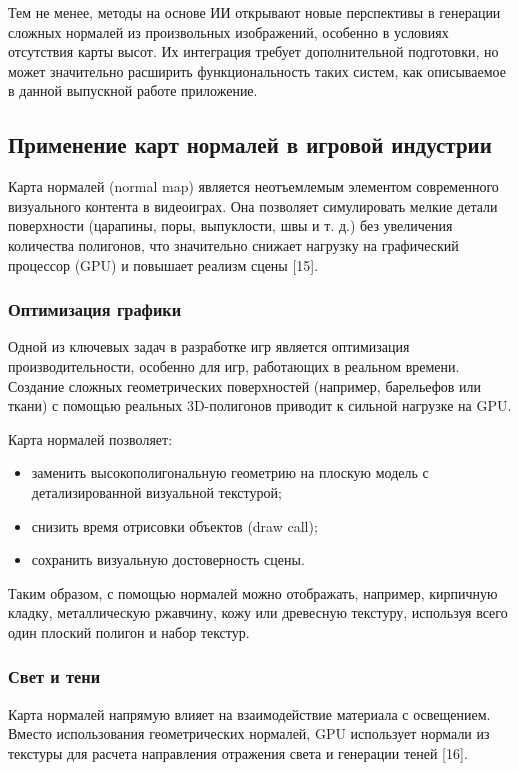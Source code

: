 Тем не менее, методы на основе ИИ открывают новые перспективы в генерации сложных нормалей из произвольных изображений, особенно в условиях отсутствия карты высот. Их интеграция требует дополнительной подготовки, но может значительно расширить функциональность таких систем, как описываемое в данной выпускной работе приложение.
\subsection{Применение карт нормалей в игровой индустрии}

Карта нормалей (normal map) является неотъемлемым элементом современного визуального контента в видеоиграх. Она позволяет симулировать мелкие детали поверхности (царапины, поры, выпуклости, швы и т. д.) без увеличения количества полигонов, что значительно снижает нагрузку на графический процессор (GPU) и повышает реализм сцены [15].
\subsubsection{Оптимизация графики}

Одной из ключевых задач в разработке игр является оптимизация производительности, особенно для игр, работающих в реальном времени. Создание сложных геометрических поверхностей (например, барельефов или ткани) с помощью реальных 3D-полигонов приводит к сильной нагрузке на GPU.

Карта нормалей позволяет: 
\begin{itemize}
	\item заменить высокополигональную геометрию на плоскую модель с детализированной визуальной текстурой;
	\item снизить время отрисовки объектов (draw call);
	\item сохранить визуальную достоверность сцены.
\end{itemize}

Таким образом, с помощью нормалей можно отображать, например, кирпичную кладку, металлическую ржавчину, кожу или древесную текстуру, используя всего один плоский полигон и набор текстур.
\subsubsection{Свет и тени}

Карта нормалей напрямую влияет на взаимодействие материала с освещением. Вместо использования геометрических нормалей, GPU использует нормали из текстуры для расчета направления отражения света и генерации теней [16].

